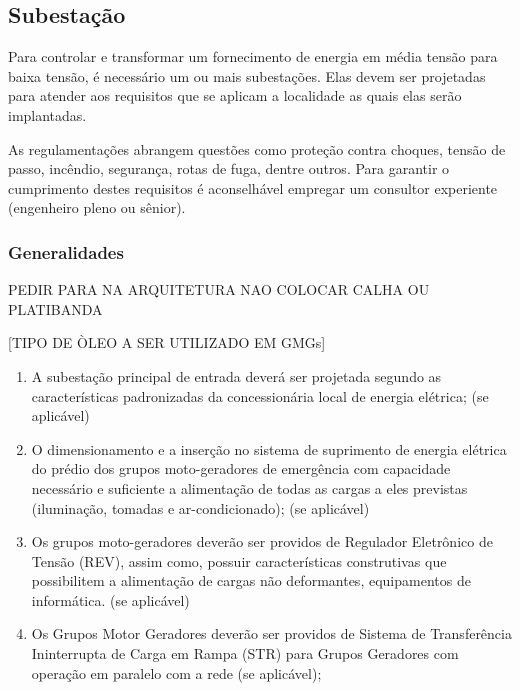\subsection{Subestação} \label{section: power plant}

Para controlar e transformar um fornecimento de energia em média tensão para baixa tensão, é necessário um ou mais subestações. Elas devem ser projetadas para atender aos requisitos que se aplicam a localidade as quais elas serão implantadas.

As regulamentações abrangem questões como proteção contra choques, tensão de passo, incêndio, segurança, rotas de fuga, dentre outros. Para garantir o cumprimento destes requisitos é aconselhável empregar um consultor experiente (engenheiro pleno ou sênior).

\subsubsection{Generalidades}

{\color{red}PEDIR PARA NA ARQUITETURA NAO COLOCAR CALHA OU PLATIBANDA}

[TIPO DE ÒLEO A SER UTILIZADO EM GMGs]

\begin{enumerate}
	\item A subestação principal de entrada deverá ser projetada segundo as características padronizadas da concessionária local de energia elétrica; (se aplicável)
	
	\item O dimensionamento e a inserção no sistema de suprimento de energia elétrica do prédio dos grupos moto-geradores de emergência com capacidade necessário e suficiente a alimentação de todas as cargas a eles previstas (iluminação, tomadas e ar-condicionado); (se aplicável)
	
	\item Os grupos moto-geradores deverão ser providos de Regulador Eletrônico de Tensão (REV), assim como, possuir características construtivas que possibilitem a alimentação de cargas não deformantes, equipamentos de informática. (se aplicável)
	
	\item Os Grupos Motor Geradores deverão ser providos de Sistema de Transferência Ininterrupta de Carga em Rampa (STR) para Grupos Geradores com operação em paralelo com a rede (se aplicável);	
	
\end{enumerate}
